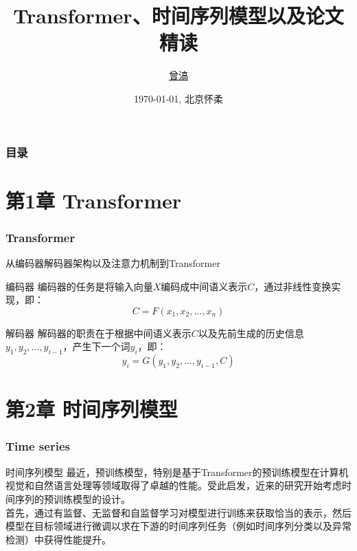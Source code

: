\documentclass[10pt]{ctexbeamer}
\title[UCAS Beamer (\LaTeX{})]{Transformer、时间序列模型以及论文精读}
\author[H. Zeng]{\href{mailto:haozeng1210@gmail.com}{曾滈}}
\institute[NAOC]{中国科学院国家天文台}
\date[\today]{\today, 北京怀柔}
\begin{document}
\begin{frame}[plain]
  \maketitle
\end{frame}

\begin{frame}[t]
  \frametitle{目录}
  \tableofcontents
\end{frame}

\section[transformer]{ 第1章 Transformer}\label{sec:1}


\begin{frame}[t]
  \frametitle{Transformer}
  从编码器解码器架构以及注意力机制到Transformer

  \begin{block}{编码器}
    编码器的任务是将输入向量$X$编码成中间语义表示$C$，通过非线性变换实现，即：
    \begin{equation}
      C = F(x_1, x_2, ..., x_n)
      \label{eq:编码器}
    \end{equation}
  \end{block}

  \begin{block}{解码器}
    解码器的职责在于根据中间语义表示$C$以及先前生成的历史信息$y_1, y_2, ..., y_{i-1}$，产生下一个词$y_i$，即：
    \begin{equation}
      y_i = G(y_1, y_2, ..., y_{i-1}, C)
      \label{eq:解码器}
    \end{equation}
  \end{block}
\end{frame}

\section[Time Series Models]{ 第2章 时间序列模型}\label{sec:2}



\begin{frame}[t]
  \frametitle{Time series}
  \begin{block}{时间序列模型}
    最近，预训练模型，特别是基于Transformer的预训练模型在计算机视觉和自然语言处理等领域取得了卓越的性能。受此启发，近来的研究开始考虑时间序列的预训练模型的设计。\\

    首先，通过有监督、无监督和自监督学习对模型进行训练来获取恰当的表示，然后模型在目标领域进行微调以求在下游的时间序列任务（例如时间序列分类以及异常检测）中获得性能提升。
  \end{block}
\end{frame}
\end{document}
